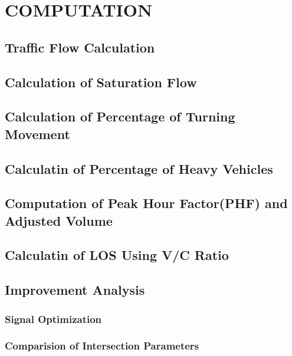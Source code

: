\chapter{COMPUTATION}

\section{Traffic Flow Calculation}

\section{Calculation of Saturation Flow}

\section{Calculation of Percentage of Turning Movement}

\section{Calculatin of Percentage of Heavy Vehicles}

\section{Computation of Peak Hour Factor(PHF) and Adjusted Volume}

\section{Calculatin of LOS Using V/C Ratio}

\section{Improvement Analysis}
\subsection{Signal Optimization}
\subsection{Comparision of Intersection Parameters}
    
